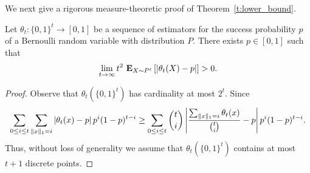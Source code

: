 We next give a rigorous measure-theoretic proof of Theorem~\ref{t:lower_bound}.
\begin{theorem}
  Let $\theta_t: \{0,1\}^t \to [0,1]$ be a sequence of estimators for
  the success probability $p$ of a Bernoulli random variable with
  distribution $P$.
  There exists $p \in [0,1]$ such that
  \[
   \lim_{t\to \infty} t^2\ \Expnew{X \sim P^t}{\lp| \theta_t(X) - p \rp|} > 0.
  \]
\end{theorem}
\begin{proof}
  Observe that $\theta_t(\{0,1\}^t)$ has cardinality at most $2^t$.
  Since
  \[
    \sum_{0 \leq i \leq t} \sum_{\norm{1}{x} = i}
    \lp| \theta_t(x) - p \rp| p^i (1-p)^{t-i}
    \geq
    \sum_{0 \leq i \leq t} \binom{t}{i} \lp|
     \frac{\sum_{\norm{1}{x} = i} \theta_t(x)}{\binom{t}{i}}  - p \rp|
    p^i (1-p)^{t-i}.
  \]
  Thus, without loss of generality we assume that
  $\theta_t(\{0,1\}^t)$ contains at most $t+1$ discrete
  points.


\end{proof}
